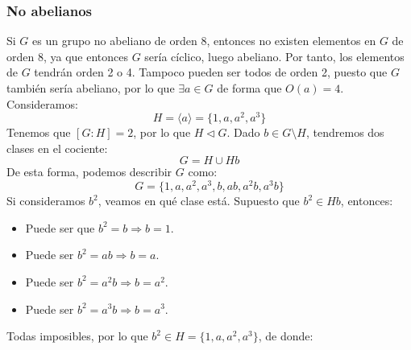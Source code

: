 \subsubsection{No abelianos}
\noindent
Si $G$ es un grupo no abeliano de orden 8, entonces no existen elementos en $G$ de orden 8, ya que entonces $G$ sería cíclico, luego abeliano. Por tanto, los elementos de $G$ tendrán orden 2 o 4. Tampoco pueden ser todos de orden 2, puesto que $G$ también sería abeliano, por lo que $\exists a\in G$ de forma que $O(a) = 4$. Consideramos:
\begin{equation*}
    H = \langle a \rangle  = \{1,a,a^2,a^3\}
\end{equation*}
Tenemos que $[G:H] = 2$, por lo que $H\lhd G$. Dado $b\in G\setminus H$, tendremos dos clases en el cociente:
\begin{equation*}
    G = H\cup Hb 
\end{equation*}
De esta forma, podemos describir $G$ como:
\begin{equation*}
    G = \{1,a,a^2,a^3,b, ab, a^2b, a^3b\}
\end{equation*}
Si consideramos $b^2$, veamos en qué clase está. Supuesto que $b^2\in Hb$, entonces:
\begin{itemize}
    \item Puede ser que $b^2 = b \Longrightarrow b = 1$.
    \item Puede ser $b^2 = ab \Longrightarrow b = a$.
    \item Puede ser $b^2 = a^2b \Longrightarrow b = a^2$.
    \item Puede ser $b^2 = a^3b \Longrightarrow b = a^3$.
\end{itemize}
Todas imposibles, por lo que $b^2 \in H = \{1,a,a^2, a^3\}$, de donde:
